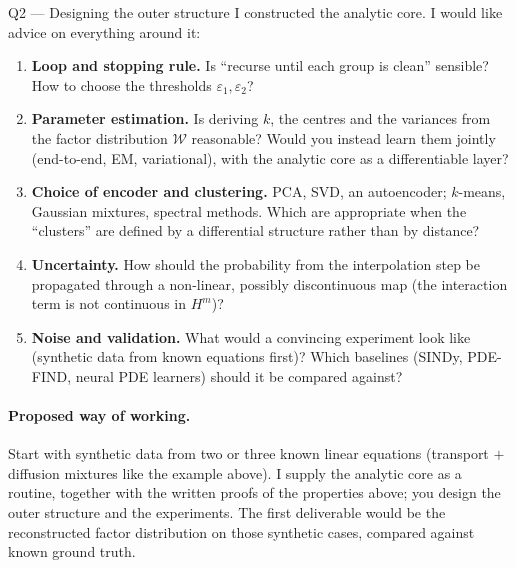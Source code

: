 \begin{askbox}{Q2 --- Designing the outer structure}
I constructed the analytic core. I would like advice on everything around it:
\begin{enumerate}[nosep,leftmargin=*]
\item \textbf{Loop and stopping rule.} Is ``recurse until each group is clean'' sensible? How to choose the thresholds $\varepsilon_1,\varepsilon_2$?
\item \textbf{Parameter estimation.} Is deriving $k$, the centres and the variances from the factor distribution $\mathcal W$ reasonable? Would you instead learn them jointly (end-to-end, EM, variational), with the analytic core as a differentiable layer?
\item \textbf{Choice of encoder and clustering.} PCA, SVD, an autoencoder; $k$-means, Gaussian mixtures, spectral methods. Which are appropriate when the ``clusters'' are defined by a differential structure rather than by distance?
\item \textbf{Uncertainty.} How should the probability from the interpolation step be propagated through a non-linear, possibly discontinuous map (the interaction term is not continuous in $H^m$)?
\item \textbf{Noise and validation.} What would a convincing experiment look like (synthetic data from known equations first)? Which baselines (SINDy, PDE-FIND, neural PDE learners) should it be compared against?
\end{enumerate}
\end{askbox}

\paragraph{Proposed way of working.}
Start with synthetic data from two or three known linear equations (transport $+$ diffusion mixtures like the example above). I supply the analytic core as a routine, together with the written proofs of the properties above; you design the outer structure and the experiments. The first deliverable would be the reconstructed factor distribution on those synthetic cases, compared against known ground truth.


